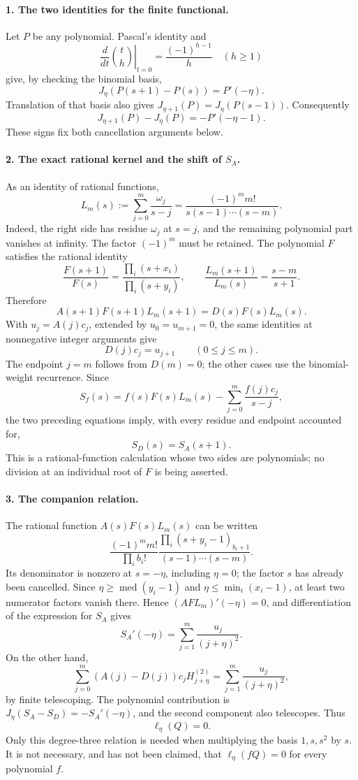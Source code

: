 \documentclass[11pt]{article}
\begin{document}
\paragraph{1. The two identities for the finite functional.}
Let $P$ be any polynomial.  Pascal's identity and
\[
 \left.\frac{d}{dt}\binom th\right|_{t=0}
 =\frac{(-1)^{h-1}}h\quad(h\ge1)
\]
give, by checking the binomial basis,
\[
 J_\eta(P(s+1)-P(s))=P'(-\eta).
\]
Translation of that basis also gives
$J_{\eta+1}(P)=J_\eta(P(s-1))$. Consequently
\[
 J_{\eta+1}(P)-J_\eta(P)=-P'(-\eta-1).
\]
These signs fix both cancellation arguments below.

\paragraph{2. The exact rational kernel and the shift of $S_A$.}
As an identity of rational functions,
\[
 L_m(s):=\sum_{j=0}^m\frac{\omega_j}{s-j}
  =\frac{(-1)^m m!}{s(s-1)\cdots(s-m)}.
\]
Indeed, the right side has residue $\omega_j$ at $s=j$, and the
remaining polynomial part vanishes at infinity.  The factor $(-1)^m$
must be retained.  The polynomial $F$ satisfies the rational identity
\[
 \frac{F(s+1)}{F(s)}=
   \frac{\prod_i(s+x_i)}{\prod_i(s+y_i)},\qquad
 \frac{L_m(s+1)}{L_m(s)}=\frac{s-m}{s+1}.
\]
Therefore
\[
 A(s+1)F(s+1)L_m(s+1)=D(s)F(s)L_m(s).
\]
With $u_j=A(j)c_j$, extended by $u_0=u_{m+1}=0$, the same identities
at nonnegative integer arguments give
\[
 D(j)c_j=u_{j+1}\qquad(0\le j\le m).
\]
The endpoint $j=m$ follows from $D(m)=0$; the other cases use the
binomial-weight recurrence.  Since
\[
 S_f(s)=f(s)F(s)L_m(s)-\sum_{j=0}^m\frac{f(j)c_j}{s-j},
\]
the two preceding equations imply, with every residue and endpoint
accounted for,
\[
 \boxed{S_D(s)=S_A(s+1).}
\]
This is a rational-function calculation whose two sides are polynomials;
no division at an individual root of $F$ is being asserted.

\paragraph{3. The companion relation.}
The rational function $A(s)F(s)L_m(s)$ can be written
\[
 \frac{(-1)^m m!}{\prod_i b_i!}
 \frac{\prod_i(s+y_i-1)_{b_i+1}}
 {(s-1)\cdots(s-m)}.
\]
Its denominator is nonzero at $s=-\eta$, including $\eta=0$;
the factor $s$ has already been cancelled.  Since
$\eta\ge\operatorname{med}(y_i-1)$ and
$\eta\le\min_i(x_i-1)$, at least two numerator factors vanish there.
Hence $(AF L_m)'(-\eta)=0$, and differentiation of the expression for
$S_A$ gives
\[
 S_A'(-\eta)=\sum_{j=1}^m\frac{u_j}{(j+\eta)^2}.
\]
On the other hand,
\[
 \sum_{j=0}^m(A(j)-D(j))c_jH_{j+\eta}^{(2)}
 =\sum_{j=1}^m\frac{u_j}{(j+\eta)^2},
\]
by finite telescoping.  The polynomial contribution is
$J_\eta(S_A-S_D)=-S_A'(-\eta)$, and the second component also
telescopes.  Thus
\[
 \boxed{\ell_\eta(Q)=0.}
\]
Only this degree-three relation is needed when multiplying the basis
$1,s,s^2$ by $s$.  It is not necessary, and has not been claimed, that
$\ell_\eta(fQ)=0$ for every polynomial $f$.
\end{document}
